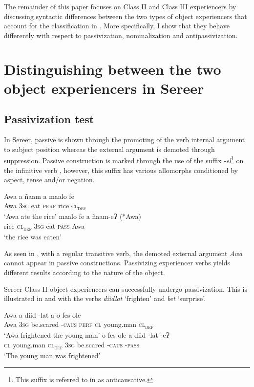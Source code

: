 \documentclass[output=paper]{langscibook}
\begin{document}
The remainder of this paper focuses on Class II and Class III experiencers by discussing syntactic differences between the two types of object experiencers that account for the classification in . More specifically, I show that they behave differently with respect to passivization, nominalization and antipassivization.


\section{Distinguishing between the two object  experiencers in Sereer}
\label{sec:tamba:3}
\subsection{Passivization test}
\label{sec:tamba:3.1}

In Sereer, passive is shown through the promoting of the verb internal argument to subject position whereas the external argument is demoted through suppression. Passive construction is marked through the use of the suffix -\textit{el}\footnote{This suffix is referred to in \citet{FayeMous2006} as anticausative.} on the infinitive verb \citep{Faye1979,Renaudier2012,Faye2013}, however, this suffix has various allomorphs conditioned by aspect, tense and/or negation.

\ea \label{ex:tamba:8}
\ea \label{ex:tamba:8a}
\gll Awa   a       ñaam   a         maalo fe\\
Awa   \textsc{3sg}   eat      \textsc{perf}    rice     \textsc{cl\textsubscript{def}}\\
\glt `Awa ate the rice'
\ex \label{ex:tamba:8b}
\gll maalo fe     a      ñaam-eɁ       (*Awa)\\
rice    \textsc{cl\textsubscript{def}} \textsc{3sg}  eat-\textsc{pass}   Awa\\
\glt `the rice was eaten'
\z
\z

As seen in , with a regular transitive verb, the demoted external argument \textit{Awa}  cannot appear in passive constructions. Passivizing experiencer verbs yields different results according to the nature of the object. 

Sereer Class II object experiencers can successfully undergo passivization. This is illustrated in  and  with the verbs \textit{diidlat} ‘frighten’ and \textit{bet} ‘surprise’. 

\ea \label{ex:tamba:9}
\ea \label{ex:tamba:9a}
\gll Awa  a      diid         {}-lat    a       o    fes            ole\\
Awa  \textsc{3sg} be.scared -\textsc{caus}  \textsc{perf}    \textsc{cl} young.man  \textsc{cl\textsubscript{def}}\\
\glt `Awa frightened the young man'
\ex \label{ex:tamba:9b}
\gll o  fes                ole     a      diid         {}-lat    {}-eɁ\\
\textsc{cl} young.man  \textsc{cl\textsubscript{def}}  \textsc{3sg}   be.scared -\textsc{caus}    \textsc{{}-pass}\\
\glt `The young man was frightened'
\z
\z
\end{document}
